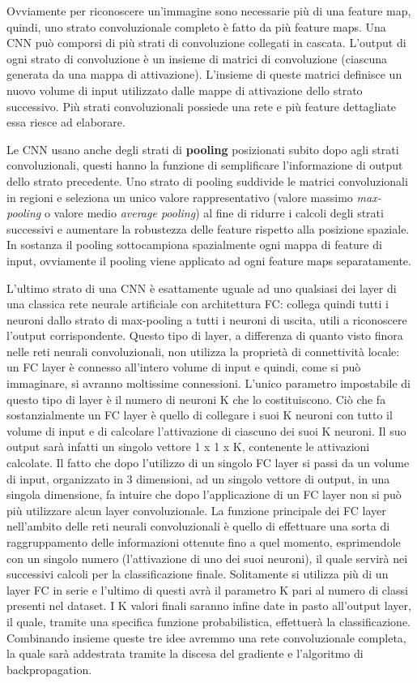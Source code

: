 \documentclass[twoside,twocolumn,10pt]{extarticle}
\theoremstyle{definition}
\begin{document}
Ovviamente per riconoscere un'immagine sono necessarie più di una feature map, quindi, uno strato convoluzionale completo è fatto da più feature maps.
Una CNN può comporsi di più strati di convoluzione collegati in cascata. L’output di ogni strato di convoluzione è un insieme di matrici di convoluzione (ciascuna generata da una mappa di attivazione). L’insieme di queste matrici definisce un nuovo volume di input utilizzato dalle mappe di attivazione dello strato successivo. Più strati convoluzionali possiede una rete e più feature dettagliate essa riesce ad elaborare.

Le CNN usano anche degli strati di \textbf{pooling} posizionati subito dopo agli strati convoluzionali, questi hanno la funzione di semplificare l'informazione di output dello strato precedente. Uno strato di pooling suddivide le matrici convoluzionali in regioni e seleziona un unico valore rappresentativo (valore massimo \textit{max-pooling} o valore medio \textit{average pooling}) al fine di ridurre i calcoli degli strati successivi e aumentare la robustezza delle feature rispetto alla posizione spaziale. In sostanza il pooling sottocampiona spazialmente ogni mappa di feature di input, ovviamente il pooling viene applicato ad ogni feature maps separatamente.

L'ultimo strato di una CNN è esattamente uguale ad uno qualsiasi dei layer di una classica rete neurale artificiale con architettura FC: collega quindi tutti i neuroni dallo strato di max-pooling a tutti i neuroni di uscita, utili a riconoscere l'output corrispondente.
Questo tipo di layer, a differenza di quanto visto finora nelle reti neurali convoluzionali, non utilizza la proprietà di connettività locale: un FC layer è connesso all'intero volume di input e quindi, come si può immaginare, si avranno moltissime connessioni. L’unico parametro impostabile di questo tipo di layer è il numero di neuroni K che lo costituiscono. Ciò che fa sostanzialmente un FC layer è quello di collegare i suoi K neuroni con tutto il volume di input e di calcolare l’attivazione di ciascuno dei suoi K neuroni.
Il suo output sarà infatti un singolo vettore 1 x 1 x K, contenente le attivazioni calcolate. Il fatto che dopo l’utilizzo di un singolo FC layer si passi da un volume di input, organizzato in 3 dimensioni, ad un singolo vettore di output, in una singola dimensione, fa intuire che dopo l’applicazione di un FC layer non si può più utilizzare alcun layer convoluzionale. La funzione principale dei FC layer nell'ambito delle reti neurali convoluzionali è quello di effettuare una sorta di raggruppamento delle informazioni ottenute fino
a quel momento, esprimendole con un singolo numero (l’attivazione di uno dei suoi neuroni), il quale servirà nei successivi calcoli per la classificazione finale. Solitamente si utilizza più di un layer FC in serie e l’ultimo di questi avrà il parametro K pari al numero di classi presenti nel dataset. I K valori finali saranno infine date in pasto all'output layer, il quale, tramite una specifica funzione probabilistica, effettuerà la classificazione. Combinando insieme queste tre idee avremmo una rete convoluzionale completa, la quale sarà addestrata tramite la discesa del gradiente e l’algoritmo di backpropagation.
\end{document}

